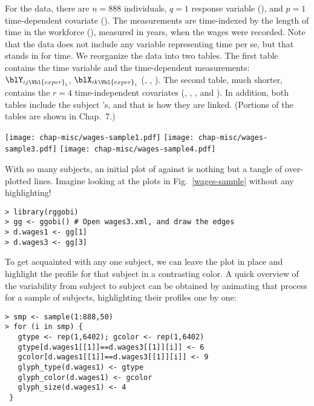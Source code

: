 
For the  data, there are $n=888$ individuals, $q=1$
response variable (), and $p=1$ time-dependent covariate
().  The measurements are time-indexed by the length of
time in the workforce (), measured in years, when the wages
were recorded.  Note that the data does not include any variable
representing time per se, but that  stands in for time.  We
reorganize the data into two tables.  The first table contains the
time variable and the time-dependent measurements:
$\blY_{ij\Vbl{exper}_i}$, $\blX_{ik\Vbl{exper}_i}$ (,
, ).  The second table, much shorter, contains
the $r=4$ time-independent covariates (, ,
, and ).  In addition, both tables include the
subject 's, and that is how they are linked.  (Portions of the
tables are shown in Chap.~7.)

\begin{figure*}[htp]
\centerline{{\texttt{[image: chap-misc/wages-sample1.pdf]}}
  {\texttt{[image: chap-misc/wages-sample3.pdf]}}
  {\texttt{[image: chap-misc/wages-sample4.pdf]}}}
\caption[Exploring the longitudinal  data]{Looking
over the longitudinal  data.  Longitudinal plots of
sampled subjects, highlighted in orange against all the data, showing
variability from subject to subject.}
\label{wages-sample}
\end{figure*}

With so many subjects, an initial plot of  against
 is nothing but a tangle of over-plotted lines.  Imagine
looking at the plots in Fig.~\ref{wages-sample} without any
highlighting!

\begin{verbatim}
> library(rggobi)
> gg <- ggobi() # Open wages3.xml, and draw the edges
> d.wages1 <- gg[1]
> d.wages3 <- gg[3]
\end{verbatim}

\noindent To get acquainted with any one subject, we can leave the
plot in place and highlight the profile for that subject in a
contrasting color.  A quick overview of the variability from subject
to subject can be obtained by animating that process for a sample of
subjects, highlighting their profiles one by one:

\begin{verbatim}
> smp <- sample(1:888,50)
> for (i in smp) {
   gtype <- rep(1,6402); gcolor <- rep(1,6402)
   gtype[d.wages1[[1]]==d.wages3[[1]][i]] <- 6
   gcolor[d.wages1[[1]]==d.wages3[[1]][i]] <- 9
   glyph_type(d.wages1) <- gtype
   glyph_color(d.wages1) <- gcolor
   glyph_size(d.wages1) <- 4
 }
\end{verbatim}

